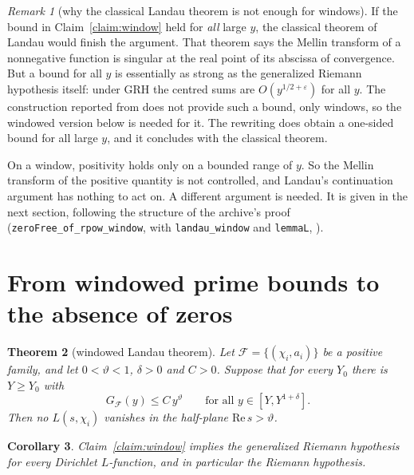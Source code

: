 \documentclass[11pt]{amsart}
\newtheorem{theorem}{Theorem}[section]
\newtheorem{corollary}[theorem]{Corollary}
\theoremstyle{definition}
\theoremstyle{remark}
\newtheorem{remark}[theorem]{Remark}
\begin{document}
\begin{remark}[why the classical Landau theorem is not enough for windows]\label{rem:allx}
If the bound in Claim~\ref{claim:window} held for \emph{all} large $y$, the classical theorem of Landau \cite[\S1.3]{MV} would finish the argument. That theorem says the Mellin transform of a nonnegative function is singular at the real point of its abscissa of convergence. But a bound for all $y$ is essentially as strong as the generalized Riemann hypothesis itself: under GRH the centred sums are $O(y^{1/2+\varepsilon})$ for all $y$. The construction reported from \cite{golf} does not provide such a bound, only windows, so the windowed version below is needed for it. The rewriting \cite{grhlean} does obtain a one-sided bound for all large $y$, and it concludes with the classical theorem.

On a window, positivity holds only on a bounded range of $y$. So the Mellin transform of the positive quantity is not controlled, and Landau's continuation argument has nothing to act on. A different argument is needed. It is given in the next section, following the structure of the archive's proof (\texttt{zeroFree\_of\_rpow\_window}, with \texttt{landau\_window} and \texttt{lemmaL}, \cite{golf}).
\end{remark}

\section{From windowed prime bounds to the absence of zeros}\label{sec:landau}

\begin{theorem}[windowed Landau theorem]\label{thm:window}
Let $\mathcal F=\{(\chi_i,a_i)\}$ be a positive family, and let $0<\vartheta<1$, $\delta>0$ and $C>0$. Suppose that for every $Y_0$ there is $Y\ge Y_0$ with
\begin{equation}\label{eq:window-hyp}
G_{\mathcal F}(y)\le C\,y^{\vartheta}\qquad\text{for all }y\in[Y,Y^{1+\delta}].
\end{equation}
Then no $L(s,\chi_i)$ vanishes in the half-plane $\mathrm{Re}\,s>\vartheta$.
\end{theorem}

\begin{corollary}\label{cor:grh}
Claim~\ref{claim:window} implies the generalized Riemann hypothesis for every Dirichlet $L$-function, and in particular the Riemann hypothesis.
\end{corollary}
\end{document}
